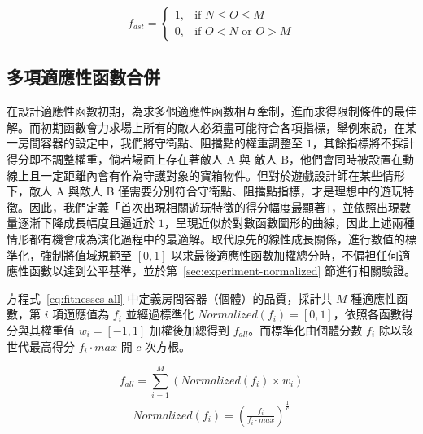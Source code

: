 \begin{equation}
    \label{eq:fitnesses-density}
    f_{dst} = \begin{cases}
                  1, & \mbox{if } N \leq O \leq M \\
                  0, & \mbox{if } O<N \text{ or } O>M
              \end{cases}
\end{equation}



\subsection{多項適應性函數合併}
\label{ssec:method-segments-multiobjectives}

在設計適應性函數初期，為求多個適應性函數相互牽制，進而求得限制條件的最佳解。而初期函數會力求場上所有的敵人必須盡可能符合各項指標，舉例來說，在某一房間容器的設定中，我們將守衛點、阻擋點的權重調整至 $1$，其餘指標將不採計得分即不調整權重，倘若場面上存在著敵人 A 與 敵人 B，他們會同時被設置在動線上且一定距離內會有作為守護對象的寶箱物件。但對於遊戲設計師在某些情形下，敵人 A 與敵人 B 僅需要分別符合守衛點、阻擋點指標，才是理想中的遊玩特徵。因此，我們定義「首次出現相關遊玩特徵的得分幅度最顯著」，並依照出現數量逐漸下降成長幅度且逼近於 $1$，呈現近似於對數函數圖形的曲線，因此上述兩種情形都有機會成為演化過程中的最適解。取代原先的線性成長關係，進行數值的標準化，強制將值域規範至 $[0, 1]$ 以求最後適應性函數加權總分時，不偏袒任何適應性函數以達到公平基準，並於第~\ref{sec:experiment-normalized} 節進行相關驗證。

方程式~\ref{eq:fitnesses-all} 中定義房間容器（個體）的品質，採計共 $M$ 種適應性函數，第 $i$ 項適應值為 $f_{i}$ 並經過標準化 $Normalized(f_{i}) = [0, 1]$，依照各函數得分與其權重值 $w_{i} = [-1, 1]$ 加權後加總得到 $f_{all}$。而標準化由個體分數 $f_{i}$ 除以該世代最高得分 $f_{i}\cdot max$ 開 $c$ 次方根。

\begin{equation}
    \label{eq:fitnesses-all}
    f_{all} = \sum_{i=1}^{M} (Normalized(f_{i}) \times w_{i})
\end{equation}
\begin{gather*}
    Normalized(f_{i}) = (\frac{f_{i}}{f_{i}\cdot max})^{\frac{1}{c}}
\end{gather*}

